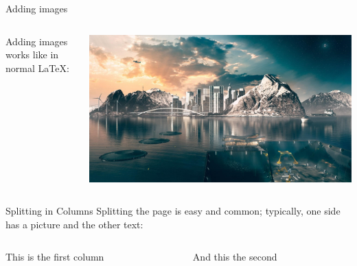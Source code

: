 \documentclass[10pt,aspectratio=169]{beamer}
\begin{document}
\begin{frame}[fragile]{Adding images}
\begin{columns}
\begin{column}{0.7\textwidth}
Adding images works like in normal \LaTeX:
\end{column}
\end{columns}
\end{frame}

\begin{frame}[fragile]{Splitting in Columns}
Splitting the page is easy and common;
typically, one side has a picture and the other text:
\begin{columns}
\begin{column}{0.6\textwidth}
This is the first column
\end{column}
\begin{column}{0.3\textwidth}
And this the second
\end{column}
\end{columns}
\end{frame}
\end{document}
